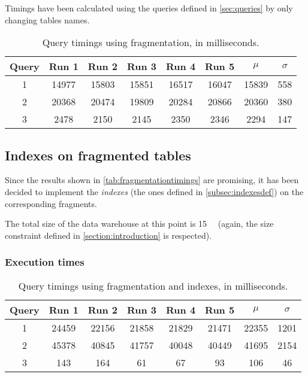 Timings have been calculated using the queries defined in \autoref{sec:queries} by only changing tables names.

\begin{table}[!h]
\centering
\begin{tabular}{|| c | c c c c c | c c ||} 
 \hline
 Query & Run 1 & Run 2 & Run 3 & Run 4 & Run 5 & 	$\mu$ & $\sigma$ \\ [0.5ex] 
 \hline\hline
 1 & 14977 & 15803 & 15851 & 16517 & 16047 & 15839 & 558 \\ 
 \hline
 2 & 20368 & 20474 & 19809 & 20284 & 20866 & 20360 & 380 \\
 \hline
 3 & 2478 & 2150 & 2145 & 2350 & 2346 & 2294 & 147 \\
 \hline
\end{tabular}
  \caption{Query timings using fragmentation, in milliseconds.}
  \label{tab:fragmentationtimings}
\end{table}



\subsection{Indexes on fragmented tables}

Since the results shown in \autoref{tab:fragmentationtimings} are promising, it has been decided to implement the \textit{indexes} (the ones defined in \autoref{subsec:indexesdef}) on the corresponding fragments.

The total size of the data warehouse at this point is \SI{15}{\giga\byte} (again, the size constraint defined in \autoref{section:introduction} is respected).


\subsubsection{Execution times}


\begin{table}[!h]
\centering
\begin{tabular}{|| c | c c c c c | c c ||} 
 \hline
 Query & Run 1 & Run 2 & Run 3 & Run 4 & Run 5 & 	$\mu$ & $\sigma$ \\ [0.5ex] 
 \hline\hline
 1 & 24459 & 22156 & 21858 & 21829 & 21471 & 22355 & 1201 \\ 
 \hline
 2 & 45378 & 40845 & 41757 & 40048 & 40449 & 41695 & 2154 \\
 \hline
 3 & 143 & 164 & 61 & 67 & 93 & 106 & 46 \\
 \hline
\end{tabular}
  \caption{Query timings using fragmentation and indexes, in milliseconds.}
  \label{tab:fragmentationindexestimings}
\end{table}